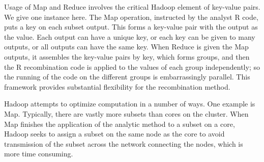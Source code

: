 Usage of Map and Reduce involves the critical Hadoop element of key-value
pairs. We give one instance here. The Map operation, instructed by the
analyst R code, puts a key on each subset
output. This forms a key-value pair with the output as the value.
Each output can have a unique key, or each key can be given to many
outputs, or all outputs can have the same key. When Reduce is given the Map
outputs, it assembles the key-value pairs by key, which forms groups,
and then the R recombination code is applied to the values of each group
independently; so the running of the code on the different groups is
embarrassingly parallel. This framework provides substantial flexibility for
the  recombination method.

Hadoop attempts to optimize computation in a number of ways. One example is
Map. Typically, there are vastly more subsets than cores on the cluster.
When Map finishes the application of the analytic method to a subset on a core,
Hadoop seeks to assign a subset on the same node as the core to avoid
transmission of the subset across the network connecting the nodes, which is
more time consuming.

